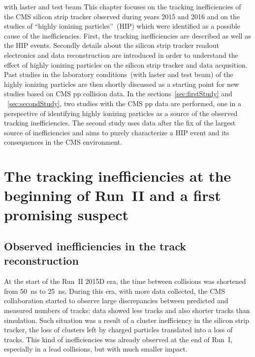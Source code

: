 
\clearpage

\setcounter{secnumdepth}{4}
\setcounter{secnumdepth}{4}

with laster and test beam
This chapter focuses on the tracking inefficiencies of the CMS silicon strip tracker observed during years 2015 and 2016 and  on the studies of ``highly ionizing particles''~(HIP) which were identified as a possible cause of the inefficiencies. First, the tracking inefficiencies are described as well as the HIP events. Secondly details about the silicon strip tracker readout electronics and data reconstruction are introduced in order to understand the effect of highly ionizing particles on the silicon strip tracker and data acqusition. Past studies in the laboratory conditions~(with laster and test beam) of the highly ionizing particles are then shortly discussed as a starting point for new studies based on CMS pp collision data. In the sections~\ref{sec:firstStudy} and ~\ref{sec:secondStudy}, two studies with the CMS pp data are performed, one in a perspective of identifying highly ionizing particles as a source of the observed tracking inefficiencies. The second study uses data after the fix of the largest source of inefficiencies and aims to purely characterize a HIP event and its consequences in the CMS environment.

\section{The tracking inefficiencies at the beginning of Run~II and a first promising suspect~\label{sec:hitIneff}}

\subsection{Observed inefficiencies in the track reconstruction}

At the start of the Run~II 2015D era, the time between collisions was shortened from 50~ns to 25~ns. During this era, with more data collected, the CMS collaboration started to observe large discrepancies between predicted and measured numbers of tracks: data showed less tracks and also shorter tracks than simulation. Such situation was a result of a cluster inefficiency in the silicon strip tracker, the loss of clusters left by charged particles translated into a loss of tracks. This kind of inefficiencies was already observed at the end of Run~I, especially in a lead collisions, but with much smaller impact. 


